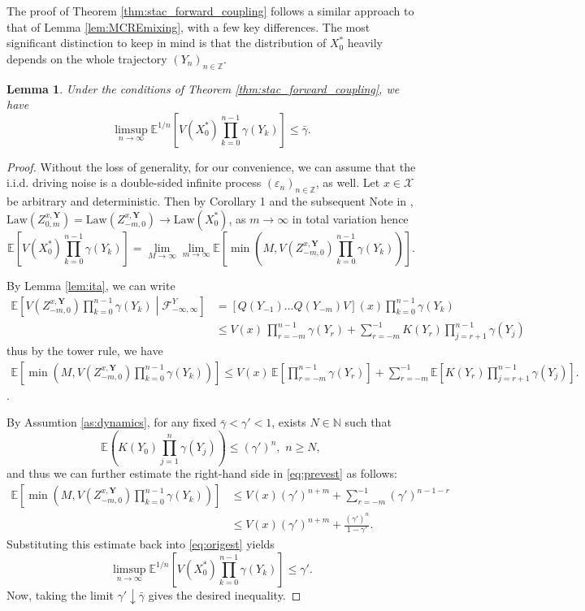 \documentclass[a4paper,10pt]{article}
\newtheorem{lemma}[theorem]{Lemma}
\newcommand{\N}{\mathbb{N}}
\newcommand{\Z}{\mathbb{Z}}
\newcommand{\F}{\mathcal{F}}
\newcommand{\X}{\mathcal{X}}
\newcommand{\E}{\mathbb{E}}
\newcommand{\law}[1]{\text{Law}(#1)}
\newcommand{\eps}{\varepsilon}
\newcommand{\ga}{\gamma}
\begin{document}
The proof of Theorem \ref{thm:stac_forward_coupling} follows a similar approach to that of Lemma \ref{lem:MCREmixing}, with a few key differences. The most significant distinction to keep in mind is that the distribution of $X_0^\ast$ heavily depends on the whole trajectory $(Y_n)_{n\in\Z}$.
\begin{lemma}\label{lem:VYbound}
Under the conditions of Theorem \ref{thm:stac_forward_coupling}, we have
$$
\limsup_{n\to\infty}\E^{1/n} \left[V(X_0^\ast)\prod_{k=0}^{n-1}\ga (Y_k)\right]\le \bar{\ga}.
$$
\end{lemma}
\begin{proof}
	Without the loss of generality, for our convenience, we can assume that the i.i.d. driving noise is a double-sided infinite process $(\eps_n)_{n\in\Z}$, as well. Let $x\in\X$ be arbitrary and deterministic. Then by Corollary 1 and the subsequent Note in  \cite{Truquet1},
	$\law{Z_{0,m}^{x,\mathbf{Y}}}=\law{Z_{-m,0}^{x,\mathbf{Y}}}\to\law{X_0^\ast}$, as $m\to\infty$ in total variation hence
	\begin{equation}\label{eq:origest}
		\E \left[V(X_0^\ast)\prod_{k=0}^{n-1}\ga (Y_k)\right] =
		\lim_{M\to\infty}
		\lim_{m\to\infty}
		\E \left[
		\min\left(
		M,V(Z_{-m,0}^{x,\mathbf{Y}})\prod_{k=0}^{n-1}\ga (Y_k)
		\right)
		\right].
	\end{equation}
	
	By Lemma \ref{lem:ita}, we can write
	\begin{align*}
		\E \left[
		V(Z_{-m,0}^{x,\mathbf{Y}})\prod_{k=0}^{n-1}\ga (Y_k)
		\middle| \F_{-\infty,\infty}^Y
		\right]
		&=[Q(Y_{-1})\ldots Q(Y_{-m})V](x)\prod_{k=0}^{n-1}\ga (Y_k)
		\\
		&\le
		V(x)\,\prod_{r=-m}^{n-1}
		\ga (Y_r)
		+ \sum_{r=-m}^{-1}K(Y_r)\prod_{j=r+1}^{n-1}
		\ga (Y_j)
	\end{align*}
	thus by the tower rule, we have
	\begin{align}\label{eq:prevest}
		\E \left[
		\min\left(
		M,V(Z_{-m,0}^{x,\mathbf{Y}})\prod_{k=0}^{n-1}\ga (Y_k)
		\right)
		\right] \le 
			V(x)\,\E\left[\prod_{r=-m}^{n-1}
		\ga (Y_r)
		\right]
		+ \sum_{r=-m}^{-1}
		\E
		\left[
		K(Y_r)\prod_{j=r+1}^{n-1}
		\ga (Y_j)
		\right].
	\end{align}.
	
	By Assumtion \ref{as:dynamics}, for any fixed $\bar{\ga}<\ga'<1$, exists $N\in\N$ such that 
	$$
	\E\left(K(Y_0)\prod_{j=1}^n\ga (Y_j)\right)\le (\ga')^n,\,\,n\ge N,
	$$
	and thus we can further estimate the right-hand side in \eqref{eq:prevest} as follows:
	\begin{align*}
			\E \left[
		\min\left(
		M,V(Z_{-m,0}^{x,\mathbf{Y}})\prod_{k=0}^{n-1}\ga (Y_k)
		\right)
		\right] 
		&\le V(x)(\ga')^{n+m}+\sum_{r=-m}^{-1} (\ga')^{n-1-r}
		\\
		&\le V(x)(\ga')^{n+m} +\frac{(\ga')^{n}}{1-\ga'}.
	\end{align*}
	Substituting this estimate back into \eqref{eq:origest} yields
	$$
	\limsup_{n\to\infty}\E^{1/n} \left[V(X_0^\ast)\prod_{k=0}^{n-1}\ga (Y_k)\right] \le \ga'.
	$$
	Now, taking the limit $\ga'\downarrow\bar{\ga}$ gives the desired inequality.
\end{proof}
\end{document}
